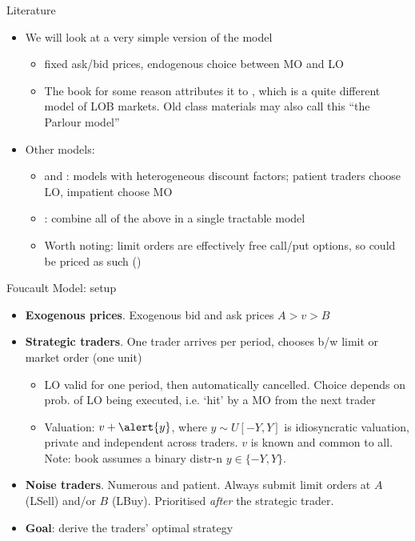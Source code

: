 \documentclass[english,10pt
,aspectratio=169
]{beamer}
\begin{document}
\begin{frame}{Literature}
	\begin{itemize}
		\item We will look at a very simple version of the  model
		\begin{itemize}
			\item fixed ask/bid prices, endogenous choice between MO and LO
			\item The book for some reason attributes it to \cite{parlour_price_1998}, which is a quite different model of LOB markets. Old class materials may also call this ``the Parlour model''
		\end{itemize}
		\item Other models:
		\begin{itemize}
			\item \cite{parlour_price_1998} and \citet*{foucault_limit_2005}: models with heterogeneous discount factors; patient traders choose LO, impatient choose MO
			\item \cite{bhattacharya_limit_2020}: combine all of the above in a single tractable model
			\item Worth noting: limit orders are effectively free call/put options, so could be priced as such (\cite{copeland_information_1983})
		\end{itemize}
	\end{itemize}
\end{frame}


\begin{frame}{Foucault Model: setup}
	\begin{itemize}
		\item \textbf{Exogenous prices}. \alert{Exogenous} bid and ask prices $A>v>B$
		\item \textbf{Strategic traders}. One trader arrives per period, chooses b/w limit or market order (one unit)
		\begin{itemize}
			\item LO valid for one period, then automatically cancelled. Choice depends on prob. of LO being executed, i.e. `hit' by a MO from the next trader
			\item Valuation: $v+\alert{y}$, where $y \sim U[-Y,Y]$ is idiosyncratic valuation, private and independent across traders. $v$ is known and common to all.
			Note: book assumes a binary distr-n $y \in \{-Y,Y\}$.
		\end{itemize}
		\item \textbf{Noise traders}. Numerous and patient. Always submit limit orders at $A$ (LSell) and/or $B$ (LBuy). Prioritised \emph{after} the strategic trader.
		\item \textbf{Goal}: derive the traders' optimal strategy
	\end{itemize}
\end{frame}
\end{document}
